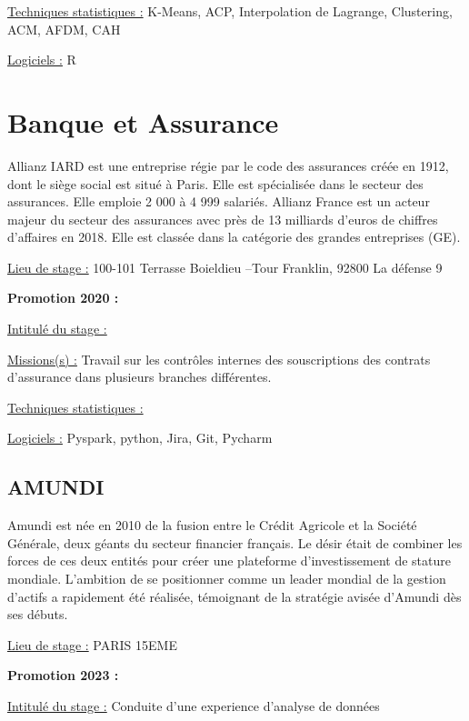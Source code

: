 \documentclass[
  letterpaper,
  DIV=11,
  numbers=noendperiod]{scrreprt}
\begin{document}
\uline{Techniques statistiques :} K-Means, ACP, Interpolation de
Lagrange, Clustering, ACM, AFDM, CAH

\uline{Logiciels :} R


\hypertarget{banque-et-assurance}{%
\chapter{Banque et Assurance}\label{banque-et-assurance}}

Allianz IARD est une entreprise régie par le code des assurances créée
en 1912, dont le siège social est situé à Paris. Elle est spécialisée
dans le secteur des assurances. Elle emploie 2 000 à 4 999 salariés.
Allianz France est un acteur majeur du secteur des assurances avec près
de 13 milliards d'euros de chiffres d'affaires en 2018. Elle est classée
dans la catégorie des grandes entreprises (GE).

\uline{Lieu de stage :} 100-101 Terrasse Boieldieu --Tour Franklin,
92800 La défense 9

\textbf{Promotion 2020 :}

\uline{Intitulé du stage :}

\uline{Missions(s) :} Travail sur les contrôles internes des
souscriptions des contrats d'assurance dans plusieurs branches
différentes.

\uline{Techniques statistiques :}

\uline{Logiciels :} Pyspark, python, Jira, Git, Pycharm

\hypertarget{amundi}{%
\section{\texorpdfstring{\textbf{AMUNDI}}{AMUNDI}}\label{amundi}}

Amundi est née en 2010 de la fusion entre le Crédit Agricole et la
Société Générale, deux géants du secteur financier français. Le désir
était de combiner les forces de ces deux entités pour créer une
plateforme d'investissement de stature mondiale. L'ambition de se
positionner comme un leader mondial de la gestion d'actifs a rapidement
été réalisée, témoignant de la stratégie avisée d'Amundi dès ses débuts.

\uline{Lieu de stage :} PARIS 15EME

\textbf{Promotion 2023 :}

\uline{Intitulé du stage :} Conduite d'une experience d'analyse de
données
\end{document}

